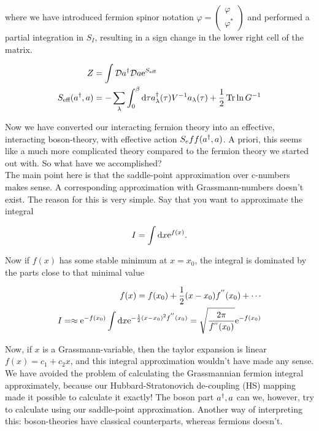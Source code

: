where we have introduced fermion spinor notation $\varphi = \begin{pmatrix} \varphi \\ \varphi^* \end{pmatrix}$ and performed a partial integration in $S_I$, resulting in a sign change in the lower right cell of the matrix. 

\begin{align*}
    Z &= \int \mathcal{D} a^{\dagger} \mathcal{D} a \mathrm{e}^{S_{\text{eff}}} \\ 
    S_{\text{eff}}(a^{\dagger}, a) &= -\sum_\lambda \int_{0}^{\beta} \dd \tau a^{\dagger}_\lambda(\tau) V^{-1} a_\lambda(\tau) + \frac{1}{2}\Tr \ln G^{-1} 
\end{align*}

Now we have converted our interacting fermion theory into an effective, interacting boson-theory, with effective action $S_eff(a^{\dagger}, a)$. A priori, this seems like a much more complicated theory compared to the fermion theory we started out with. So what have we accomplished? \\ 

The main point here is that the saddle-point approximation over c-numbers makes sense. A corresponding approximation with Grassmann-numbers doesn't exist. The reason for this is very simple. Say that you want to approximate the integral 

\begin{equation*}
    I = \int \dd x \mathrm{e}^{f(x)}.
\end{equation*}

Now if $f(x)$ has some stable minimum at $x = x_0$, the integral is dominated by the parts close to that minimal value

\begin{align*}
    f(x) = f(x_0) + \frac{1}{2}(x-x_0)f^{''}(x_0) + \cdots \\ 
    I = \approx \mathrm{e}^{-f(x_0)}\int \dd x \mathrm{e}^{-\frac{1}{2}(x - x_0)^{2} f^{''}(x_0)} = \sqrt{\frac{2\pi}{f^{''}(x_0)}}\mathrm{e}^{-f(x_0)}
\end{align*}

Now, if $x$ is a Grassmann-variable, then the taylor expansion is linear $f(x) = c_1 + c_2 x$, and this integral approximation wouldn't have made any sense. We have avoided the problem of calculating the Grassmannian fermion integral approximately, because our Hubbard-Stratonovich de-coupling (HS) mapping made it possible to calculate it exactly! The boson part $a^{\dagger}, a$ can we, however, try to calculate using our saddle-point approximation. Another way of interpreting this: boson-theories have classical counterparts, whereas fermions doesn't. 

